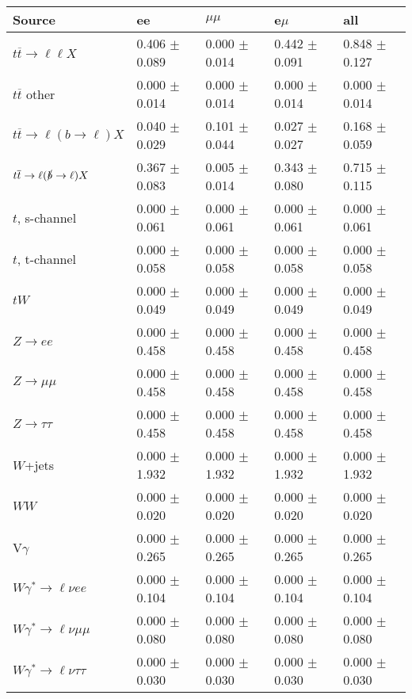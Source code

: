 \begin{tabular}{l | l l l l}
\hline\hline
 Source  &  ee  &  $\mu\mu$  &  e$\mu$  &  all \\
\hline
$t\overline{t}\rightarrow \ell\ell X$ &  0.406 $\pm$  0.089 &  0.000 $\pm$  0.014 &  0.442 $\pm$  0.091 &  0.848 $\pm$  0.127\\
$t\overline{t}$ other &  0.000 $\pm$  0.014 &  0.000 $\pm$  0.014 &  0.000 $\pm$  0.014 &  0.000 $\pm$  0.014\\
$t\overline{t}\rightarrow \ell(b\rightarrow \ell)X$ &  0.040 $\pm$  0.029 &  0.101 $\pm$  0.044 &  0.027 $\pm$  0.027 &  0.168 $\pm$  0.059\\
$t\overline{t}\rightarrow \ell(\slashed{b}\rightarrow \ell)X$ &  0.367 $\pm$  0.083 &  0.005 $\pm$  0.014 &  0.343 $\pm$  0.080 &  0.715 $\pm$  0.115\\
\hline
$t$, s-channel &  0.000 $\pm$  0.061 &  0.000 $\pm$  0.061 &  0.000 $\pm$  0.061 &  0.000 $\pm$  0.061\\
$t$, t-channel &  0.000 $\pm$  0.058 &  0.000 $\pm$  0.058 &  0.000 $\pm$  0.058 &  0.000 $\pm$  0.058\\
$tW$ &  0.000 $\pm$  0.049 &  0.000 $\pm$  0.049 &  0.000 $\pm$  0.049 &  0.000 $\pm$  0.049\\
\hline
$Z\rightarrow ee$ &  0.000 $\pm$  0.458 &  0.000 $\pm$  0.458 &  0.000 $\pm$  0.458 &  0.000 $\pm$  0.458\\
$Z\rightarrow\mu\mu$ &  0.000 $\pm$  0.458 &  0.000 $\pm$  0.458 &  0.000 $\pm$  0.458 &  0.000 $\pm$  0.458\\
$Z\rightarrow\tau\tau$ &  0.000 $\pm$  0.458 &  0.000 $\pm$  0.458 &  0.000 $\pm$  0.458 &  0.000 $\pm$  0.458\\
$W$+jets &  0.000 $\pm$  1.932 &  0.000 $\pm$  1.932 &  0.000 $\pm$  1.932 &  0.000 $\pm$  1.932\\
$WW$ &  0.000 $\pm$  0.020 &  0.000 $\pm$  0.020 &  0.000 $\pm$  0.020 &  0.000 $\pm$  0.020\\
\hline
V$\gamma$ &  0.000 $\pm$  0.265 &  0.000 $\pm$  0.265 &  0.000 $\pm$  0.265 &  0.000 $\pm$  0.265\\
$W\gamma^{*}\rightarrow\ell\nu e e$ &  0.000 $\pm$  0.104 &  0.000 $\pm$  0.104 &  0.000 $\pm$  0.104 &  0.000 $\pm$  0.104\\
$W\gamma^{*}\rightarrow\ell\nu\mu\mu$ &  0.000 $\pm$  0.080 &  0.000 $\pm$  0.080 &  0.000 $\pm$  0.080 &  0.000 $\pm$  0.080\\
$W\gamma^{*}\rightarrow\ell\nu\tau\tau$ &  0.000 $\pm$  0.030 &  0.000 $\pm$  0.030 &  0.000 $\pm$  0.030 &  0.000 $\pm$  0.030\\

\end{tabular}
